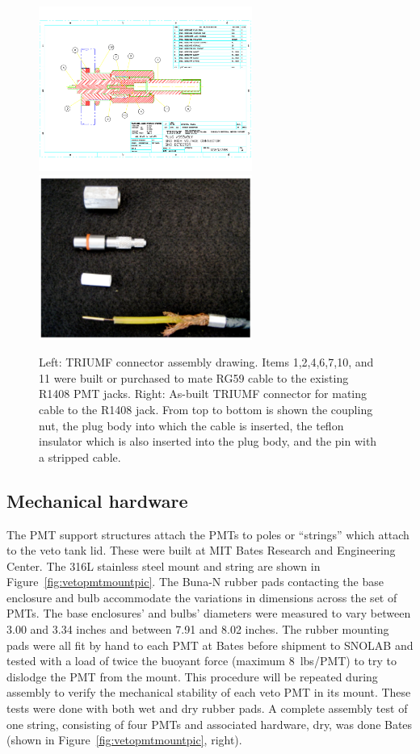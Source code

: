 \documentclass[review,number,sort&compress]{elsarticle}
\begin{document}
\begin{figure}[ht]
\begin{center}
\includegraphics[width=2.75in]{graphics/snoConnectorDrawings.pdf}
\includegraphics[width=2.75in]{graphics/connectorpic.pdf}
\caption{Left: TRIUMF connector assembly drawing. Items 1,2,4,6,7,10, and 11 were built or purchased to mate RG59 cable to the existing R1408 PMT jacks. Right: As-built TRIUMF connector for mating cable to the R1408 jack. From top to bottom is shown the coupling nut, the plug body into which the cable is inserted, the teflon insulator which is also inserted into the plug body, and the pin with a stripped cable.
\label{fig:connectordrawing}}
\end{center}
\end{figure}


\subsection{Mechanical hardware}
%
The PMT support structures attach the PMTs to poles or
``strings'' which attach to the veto tank lid. These were built at
MIT Bates Research and Engineering Center. 
The 316L stainless steel mount and string are shown in
Figure~\ref{fig:vetopmtmountpic}. The
Buna-N rubber pads contacting the base enclosure and bulb accommodate
the variations in dimensions across the set of PMTs. The base
enclosures' and bulbs' diameters were measured to vary between 3.00
and 3.34 inches and between 7.91 and 8.02 inches. The rubber mounting
pads were all fit by hand to each PMT at Bates before shipment to
SNOLAB and tested with a load of twice the buoyant force (maximum
8~lbs/PMT) to try to dislodge the PMT from the mount. This procedure
will be repeated during assembly to verify the mechanical stability of
each veto PMT in its mount. These tests were done with both wet and dry
rubber pads. A complete assembly test of one string, consisting of
four PMTs and associated hardware, dry, was done Bates (shown in Figure~\ref{fig:vetopmtmountpic}, right).
\end{document}
